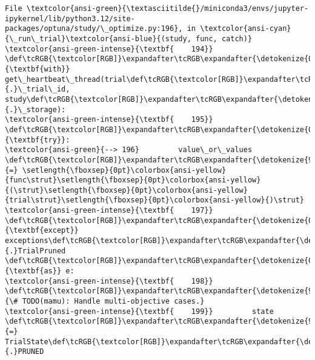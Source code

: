 \documentclass[11pt]{article}
\begin{document}
\begin{Verbatim}[commandchars=\\\{\}, frame=single, framerule=2mm, rulecolor=\color{outerrorbackground}]
File \textcolor{ansi-green}{\textasciitilde{}/miniconda3/envs/jupyter-ipykernel/lib/python3.12/site-packages/optuna/study/\_optimize.py:196}, in \textcolor{ansi-cyan}{\_run\_trial}\textcolor{ansi-blue}{(study, func, catch)}
\textcolor{ansi-green-intense}{\textbf{    194}} \def\tcRGB{\textcolor[RGB]}\expandafter\tcRGB\expandafter{\detokenize{0,135,0}}{\textbf{with}} get\_heartbeat\_thread(trial\def\tcRGB{\textcolor[RGB]}\expandafter\tcRGB\expandafter{\detokenize{98,98,98}}{.}\_trial\_id, study\def\tcRGB{\textcolor[RGB]}\expandafter\tcRGB\expandafter{\detokenize{98,98,98}}{.}\_storage):
\textcolor{ansi-green-intense}{\textbf{    195}}     \def\tcRGB{\textcolor[RGB]}\expandafter\tcRGB\expandafter{\detokenize{0,135,0}}{\textbf{try}}:
\textcolor{ansi-green}{--> 196}         value\_or\_values \def\tcRGB{\textcolor[RGB]}\expandafter\tcRGB\expandafter{\detokenize{98,98,98}}{=} \setlength{\fboxsep}{0pt}\colorbox{ansi-yellow}{func\strut}\setlength{\fboxsep}{0pt}\colorbox{ansi-yellow}{(\strut}\setlength{\fboxsep}{0pt}\colorbox{ansi-yellow}{trial\strut}\setlength{\fboxsep}{0pt}\colorbox{ansi-yellow}{)\strut}
\textcolor{ansi-green-intense}{\textbf{    197}}     \def\tcRGB{\textcolor[RGB]}\expandafter\tcRGB\expandafter{\detokenize{0,135,0}}{\textbf{except}} exceptions\def\tcRGB{\textcolor[RGB]}\expandafter\tcRGB\expandafter{\detokenize{98,98,98}}{.}TrialPruned \def\tcRGB{\textcolor[RGB]}\expandafter\tcRGB\expandafter{\detokenize{0,135,0}}{\textbf{as}} e:
\textcolor{ansi-green-intense}{\textbf{    198}}         \def\tcRGB{\textcolor[RGB]}\expandafter\tcRGB\expandafter{\detokenize{95,135,135}}{\# TODO(mamu): Handle multi-objective cases.}
\textcolor{ansi-green-intense}{\textbf{    199}}         state \def\tcRGB{\textcolor[RGB]}\expandafter\tcRGB\expandafter{\detokenize{98,98,98}}{=} TrialState\def\tcRGB{\textcolor[RGB]}\expandafter\tcRGB\expandafter{\detokenize{98,98,98}}{.}PRUNED


\end{Verbatim}
\end{document}
